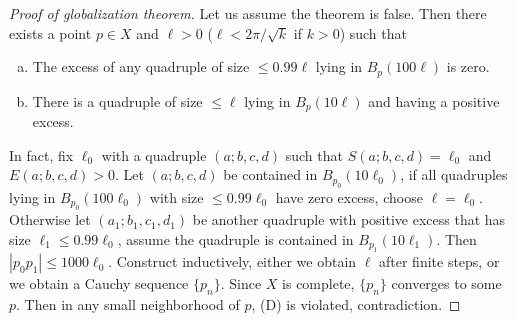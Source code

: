 \begin{proof}[Proof of globalization theorem]
    Let us assume the theorem is false.
    Then there exists a point $p\in X$ and $\ell>0$ ($\ell<2\pi/\sqrt{k}$ if $k>0$) such that
    \begin{enumerate}[(a)]
        \item The excess of any quadruple of size $\leq 0.99\ell$ lying in $B_p(100\ell)$ is zero.
        \item There is a quadruple of size $\leq\ell$ lying in $B_p(10\ell)$ and having a positive excess.
    \end{enumerate}
    In fact, fix $\ell_0$ with a quadruple $(a;b,c,d)$ such that $S(a;b,c,d)=\ell_0$ and $E(a;b,c,d)>0$.
    Let $(a;b,c,d)$ be contained in $B_{p_0}(10\ell_0)$, if all quadruples lying in $B_{p_0}(100\ell_0)$ with size $\leq 0.99\ell_0$ have zero excess, choose $\ell=\ell_0$.
    Otherwise let $(a_1;b_1,c_1,d_1)$ be another quadruple with positive excess that has size $\ell_1\leq 0.99\ell_0$, assume the quadruple is contained in $B_{p_1}(10\ell_1)$.
    Then $|p_0p_1|\leq 1000\ell_0$.
    Construct inductively, either we obtain $\ell$ after finite steps, or we obtain a Cauchy sequence $\{p_n\}$.
    Since $X$ is complete, $\{p_n\}$ converges to some $p$.
    Then in any small neighborhood of $p$, (D) is violated, contradiction.


\end{proof}
